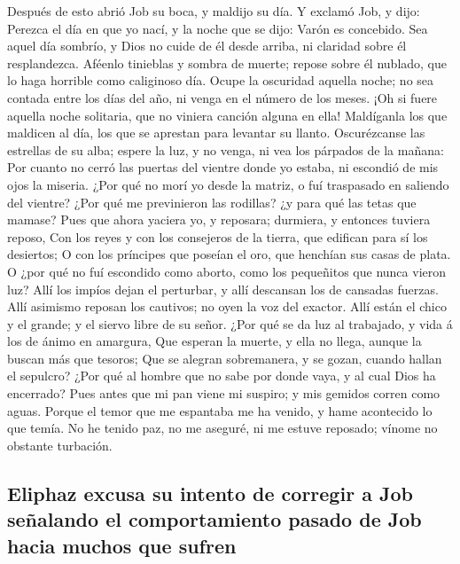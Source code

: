  Después de esto abrió Job su boca, y maldijo su día.
 Y exclamó Job, y dijo:  Perezca el día en que
yo nací, y la noche que se dijo: Varón es concebido.  Sea
aquel día sombrío, y Dios no cuide de él desde arriba, ni claridad sobre
él resplandezca.  Aféenlo tinieblas y sombra de muerte;
repose sobre él nublado, que lo haga horrible como caliginoso día.
 Ocupe la oscuridad aquella noche; no sea contada entre los
días del año, ni venga en el número de los meses.  ¡Oh si
fuere aquella noche solitaria, que no viniera canción alguna en ella!
 Maldíganla los que maldicen al día, los que se aprestan
para levantar su llanto.  Oscurézcanse las estrellas de su
alba; espere la luz, y no venga, ni vea los párpados de la mañana:
 Por cuanto no cerró las puertas del vientre donde yo
estaba, ni escondió de mis ojos la miseria.  ¿Por qué no
morí yo desde la matriz, o fuí traspasado en saliendo del vientre?
 ¿Por qué me previnieron las rodillas? ¿y para qué las
tetas que mamase?  Pues que ahora yaciera yo, y reposara;
durmiera, y entonces tuviera reposo,  Con los reyes y con
los consejeros de la tierra, que edifican para sí los desiertos;
 O con los príncipes que poseían el oro, que henchían sus
casas de plata.  O ¿por qué no fuí escondido como aborto,
como los pequeñitos que nunca vieron luz?  Allí los impíos
dejan el perturbar, y allí descansan los de cansadas fuerzas.
 Allí asimismo reposan los cautivos; no oyen la voz del
exactor.  Allí están el chico y el grande; y el siervo
libre de su señor.  ¿Por qué se da luz al trabajado, y vida
á los de ánimo en amargura,  Que esperan la muerte, y ella
no llega, aunque la buscan más que tesoros;  Que se alegran
sobremanera, y se gozan, cuando hallan el sepulcro?  ¿Por
qué al hombre que no sabe por donde vaya, y al cual Dios ha encerrado?
 Pues antes que mi pan viene mi suspiro; y mis gemidos
corren como aguas.  Porque el temor que me espantaba me ha
venido, y hame acontecido lo que temía.  No he tenido paz,
no me aseguré, ni me estuve reposado; vínome no obstante turbación.

\hypertarget{eliphaz-excusa-su-intento-de-corregir-a-job-seuxf1alando-el-comportamiento-pasado-de-job-hacia-muchos-que-sufren}{%
\subsection{Eliphaz excusa su intento de corregir a Job señalando el
comportamiento pasado de Job hacia muchos que
sufren}\label{eliphaz-excusa-su-intento-de-corregir-a-job-seuxf1alando-el-comportamiento-pasado-de-job-hacia-muchos-que-sufren}}

